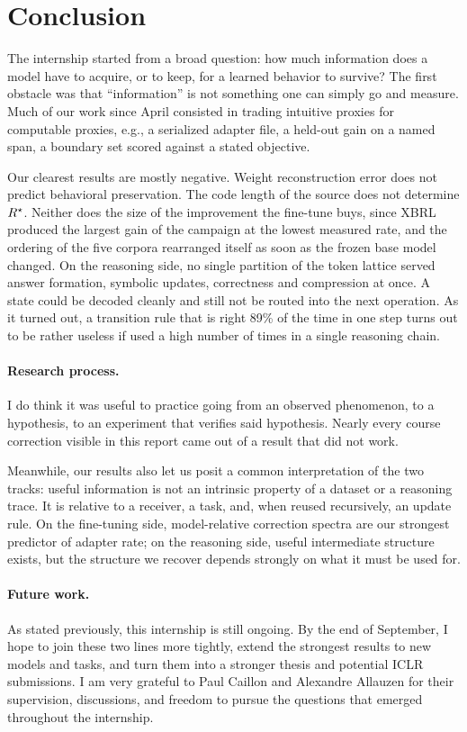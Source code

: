 \section{Conclusion}
\label{sec:conclusion}

The internship started from a broad question: how much information does a model have to acquire, or to keep, for a learned behavior to survive? The first obstacle was that ``information'' is not something one can simply go and measure. Much of our work since April consisted in trading intuitive proxies for computable proxies, e.g., a serialized adapter file, a held-out gain on a named span, a boundary set scored against a stated objective.

Our clearest results are mostly negative. Weight reconstruction error does not predict behavioral preservation. The code length of the source does not determine $R^{\star}$. Neither does the size of the improvement the fine-tune buys, since XBRL produced the largest gain of the campaign at the lowest measured rate, and the ordering of the five corpora rearranged itself as soon as the frozen base model changed. On the reasoning side, no single partition of the token lattice served answer formation, symbolic updates, correctness and compression at once. A state could be decoded cleanly and still not be routed into the next operation. As it turned out, a transition rule that is right 89\% of the time in one step turns out to be rather useless if used a high number of times in a single reasoning chain.

\paragraph{Research process.} I do think it was useful to practice going from an observed phenomenon, to a hypothesis, to an experiment that verifies said hypothesis. Nearly every course correction visible in this report came out of a result that did not work.

Meanwhile, our results also let us posit a common interpretation of the two tracks: useful information is not an intrinsic property of a dataset or a reasoning trace. It is relative to a receiver, a task, and, when reused recursively, an update rule. On the fine-tuning side, model-relative correction spectra are our strongest predictor of adapter rate; on the reasoning side, useful intermediate structure exists, but the structure we recover depends strongly on what it must be used for.

\paragraph{Future work.} As stated previously, this internship is still ongoing. By the end of September, I hope to join these two lines more tightly, extend the strongest results to new models and tasks, and turn them into a stronger thesis and potential ICLR submissions. I am very grateful to Paul Caillon and Alexandre Allauzen for their supervision, discussions, and freedom to pursue the questions that emerged throughout the internship.
